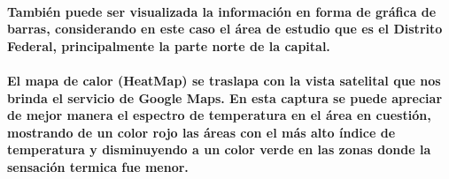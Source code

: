     \paragraph{También puede ser visualizada la información en forma de gráfica de barras, considerando en este caso el área de estudio que es el Distrito Federal, principalmente la parte norte de la capital.}
    \paragraph{El mapa de calor (HeatMap) se traslapa con la vista satelital que nos brinda el servicio de Google Maps. En esta captura se puede apreciar de mejor manera el espectro de temperatura en el área en cuestión, mostrando de un color rojo las áreas con el más alto índice de temperatura y disminuyendo a un color verde en las zonas donde la sensación termica fue menor.}